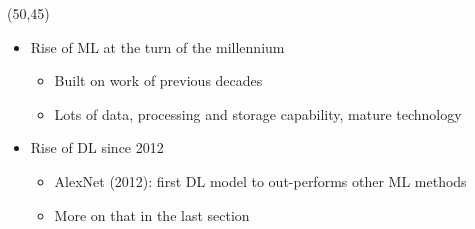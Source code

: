 \begin{frame}
  \begin{textblock}{45}(50,45)
    \begin{itemize}
    \item<7-> Rise of \ac{ML} at the turn of the millennium
      \begin{itemize}
      \item Built on work of previous decades
      \item Lots of data, processing and storage capability, mature technology
      \end{itemize}
    \item<8-> Rise of \acl{DL} since 2012
      \begin{itemize}
      \item AlexNet (2012): first \ac{DL} model to out-performs other \ac{ML}
        methods
      \item More on that in the last section
      \end{itemize}
    \end{itemize}
  \end{textblock}
\end{frame}


